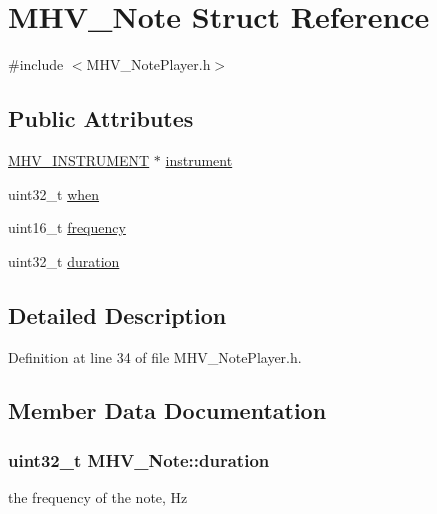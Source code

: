 \hypertarget{struct_m_h_v___note}{
\section{\-M\-H\-V\-\_\-\-Note \-Struct \-Reference}
\label{struct_m_h_v___note}
}


{\ttfamily \#include $<$\-M\-H\-V\-\_\-\-Note\-Player.\-h$>$}

\subsection*{\-Public \-Attributes}
\begin{DoxyCompactItemize}
\item 
\hyperlink{_m_h_v___wave_generator_8h_ad8420c0a6c4bf917359c2c4f2e7720d3}{\-M\-H\-V\-\_\-\-I\-N\-S\-T\-R\-U\-M\-E\-N\-T} $\ast$ \hyperlink{struct_m_h_v___note_ae799998aafadeb322df99805a9c0d1bf}{instrument}
\item 
uint32\-\_\-t \hyperlink{struct_m_h_v___note_a561bc0a1d803744be9908e23fed4a017}{when}
\item 
uint16\-\_\-t \hyperlink{struct_m_h_v___note_a24c7addceca4036405ee15ecb0a01c71}{frequency}
\item 
uint32\-\_\-t \hyperlink{struct_m_h_v___note_ad15f9085f0a69ffcf1c66a2f00bbf222}{duration}
\end{DoxyCompactItemize}


\subsection{\-Detailed \-Description}


\-Definition at line 34 of file \-M\-H\-V\-\_\-\-Note\-Player.\-h.



\subsection{\-Member \-Data \-Documentation}
\hypertarget{struct_m_h_v___note_ad15f9085f0a69ffcf1c66a2f00bbf222}{
\subsubsection[{duration}]{\setlength{\rightskip}{0pt plus 5cm}uint32\-\_\-t {\bf \-M\-H\-V\-\_\-\-Note\-::duration}}}
\label{struct_m_h_v___note_ad15f9085f0a69ffcf1c66a2f00bbf222}
the frequency of the note, \-Hz 

